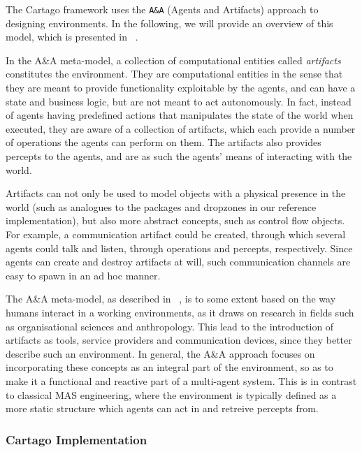 The Cartago framework uses the \texttt{A\&A} (Agents and Artifacts)
approach to designing environments. In the following, we will provide
an overview of this model, which is presented in ~\cite{Ricci08}.

In the A\&A meta-model, a collection of computational entities called
\emph{artifacts} constitutes the environment. They are computational
entities in the sense that they are meant to provide functionality
exploitable by the agents, and can have a state and business logic,
but are not meant to act autonomously. In fact, instead of agents
having predefined actions that manipulates the state of the world
when executed, they are aware of a collection of artifacts, which
each provide a number of operations the agents can perform on them.
The artifacts also provides percepts to the agents, and are as such
the agents' means of interacting with the world. 

Artifacts can not only be used to model objects with a physical presence
in the world (such as analogues to the packages and dropzones in our
reference implementation), but also more abstract concepts, such as
control flow objects. For example, a communication artifact could
be created, through which several agents could talk and listen, through
operations and percepts, respectively. Since agents can create and
destroy artifacts at will, such communication channels are easy to
spawn in an ad hoc manner.

The A\&A meta-model, as described in ~\cite{Ricci08}, is to some
extent based on the way humans interact in a working environments,
as it draws on research in fields such as organisational sciences
and anthropology. This lead to the introduction of artifacts as tools,
service providers and communication devices, since they better describe
such an environment. In general, the A\&A approach focuses on incorporating
these concepts as an integral part of the environment, so as to make
it a functional and reactive part of a multi-agent system. This is
in contrast to classical MAS engineering, where the environment is
typically defined as a more static structure which agents can act
in and retreive percepts from.


\subsubsection*{Cartago Implementation}

